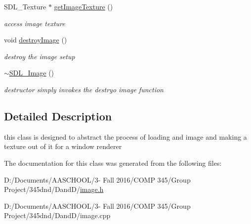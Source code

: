 \begin{DoxyCompactItemize}
\hypertarget{class_s_d_l___image_a57ef1d2f72419dcd3a84ab8059fadf46}{}\label{class_s_d_l___image_a57ef1d2f72419dcd3a84ab8059fadf46} 
S\+D\+L\+\_\+\+Texture $\ast$ \hyperlink{class_s_d_l___image_a57ef1d2f72419dcd3a84ab8059fadf46}{get\+Image\+Texture} ()
\begin{DoxyCompactList}\small\item\em access image texture \end{DoxyCompactList}\item 
\hypertarget{class_s_d_l___image_a8ca33a51cf09e6c6299aac9e81d46c2f}{}\label{class_s_d_l___image_a8ca33a51cf09e6c6299aac9e81d46c2f} 
void \hyperlink{class_s_d_l___image_a8ca33a51cf09e6c6299aac9e81d46c2f}{destroy\+Image} ()
\begin{DoxyCompactList}\small\item\em destroy the image setup \end{DoxyCompactList}\item 
\hypertarget{class_s_d_l___image_acaf74b72cd075afe6b60a2ac359836e7}{}\label{class_s_d_l___image_acaf74b72cd075afe6b60a2ac359836e7} 
\hyperlink{class_s_d_l___image_acaf74b72cd075afe6b60a2ac359836e7}{$\sim$\+S\+D\+L\+\_\+\+Image} ()
\begin{DoxyCompactList}\small\item\em destructor simply invokes the destryo image function \end{DoxyCompactList}\end{DoxyCompactItemize}


\subsection{Detailed Description}
this class is designed to abstract the process of loading and image and making a texture out of it for a window renderer 

The documentation for this class was generated from the following files\+:\begin{DoxyCompactItemize}
\item 
D\+:/\+Documents/\+A\+A\+S\+C\+H\+O\+O\+L/3-\/ Fall 2016/\+C\+O\+M\+P 345/\+Group Project/345dnd/\+Dand\+D/\hyperlink{image_8h}{image.\+h}\item 
D\+:/\+Documents/\+A\+A\+S\+C\+H\+O\+O\+L/3-\/ Fall 2016/\+C\+O\+M\+P 345/\+Group Project/345dnd/\+Dand\+D/image.\+cpp\end{DoxyCompactItemize}
